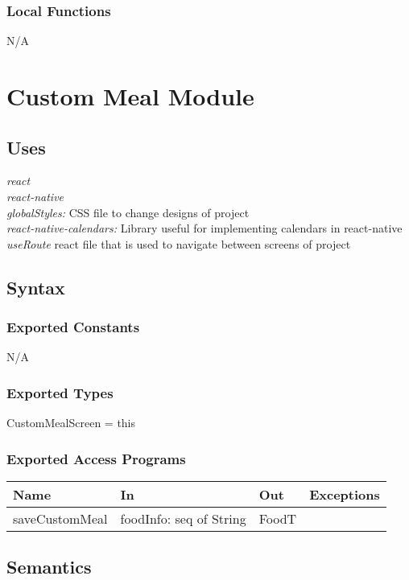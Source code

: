 \documentclass[12pt, titlepage]{article}
\begin{document}
\subsubsection{Local Functions}

N/A

\section{Custom Meal Module} \label{Module} 

\subsection{Uses}
{\textit{react}}\\
{\textit{react-native}}\\
{\textit{globalStyles:} CSS file to change designs of project}\\
{\textit{react-native-calendars:} Library useful for implementing calendars in react-native}\\
{\textit{useRoute} react file that is used to navigate between screens of project}\\

\subsection{Syntax}

\subsubsection{Exported Constants}
N/A

\subsubsection{Exported Types}
CustomMealScreen = this

\subsubsection{Exported Access Programs}

\begin{tabular}{| l | l | l | l |}
\hline
{\textbf{Name}} & {\textbf{In}} & {\textbf{Out}} & {\textbf{Exceptions}}\\
\hline
{saveCustomMeal} &foodInfo: seq of String &FoodT & \\
\hline
\end{tabular}

\subsection{Semantics}
\end{document}
